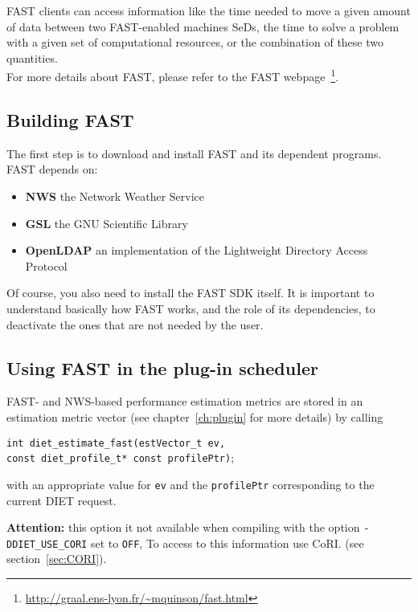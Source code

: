 FAST clients can access information like the time needed to move a
given amount of data between two FAST-enabled machines SeDs, the
time to solve a problem with a given set of computational resources,
or the combination of these two quantities.\\

For more details about FAST, please refer to the FAST
webpage~\footnote{\url{http://graal.ens-lyon.fr/~mquinson/fast.html}}.

\subsection{Building FAST}

The first step is to download and install FAST and its
dependent programs.  FAST depends on:
\begin{itemize}
 \item{\textbf{NWS}} the Network Weather Service
 \item{\textbf{GSL}} the GNU Scientific Library
 \item{\textbf{OpenLDAP}} an implementation of the Lightweight
                          Directory Access Protocol
\end{itemize}
Of course, you also need to install the FAST SDK itself. It is important to
understand basically how FAST works, and the role of its dependencies, to
deactivate the ones that are not needed by the user.

\subsection{Using FAST in the plug-in scheduler}\label{subsection:callFAST}

FAST- and NWS-based performance estimation metrics are stored in
  an estimation metric vector (see chapter~\ref{ch:plugin} for more details) by calling
  \begin{tabbing}
    \texttt{int diet\_estimate\_fast(}\=\texttt{estVector\_t ev,} \\
    \> \texttt{const diet\_profile\_t* const profilePtr)};
  \end{tabbing}
   with an appropriate value for \texttt{ev} and the
   \texttt{profilePtr} corresponding to the current DIET request.

   \textbf{Attention: } this option it not available when compiling 
   with the option \texttt{-DDIET\_USE\_CORI} set to \texttt{OFF}, 
   To access to this information use CoRI.
   (see section~\ref{sec:CORI}).

